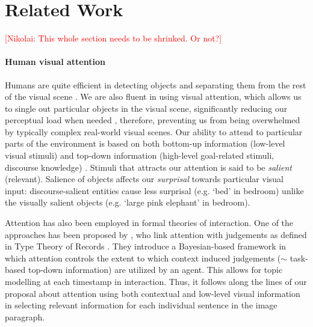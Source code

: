 \documentclass[11pt,a4paper]{article}
\newcommand{\kibitz}[2]{\ifnum\Comments=1\textcolor{#1}{#2}\fi}
\newcommand{\nikolai}[1]{\kibitz{red}      {[Nikolai: #1]}}
\begin{document}

\section{Related Work}

\nikolai{This whole section needs to be shrinked. Or not?}

\paragraph{Human visual attention}
Humans are quite efficient in detecting objects and separating them from the rest of the visual scene \cite{Ullman87}. We are also fluent in using visual attention, which allows us to single out particular objects in the visual scene, significantly reducing our perceptual load when needed \cite{Lavie04}, therefore, preventing us from being overwhelmed by typically complex real-world visual scenes.
Our ability to attend to particular parts of the environment is based on both bottom-up information (low-level visual stimuli) and top-down information (high-level goal-related stimuli, discourse knowledge) \cite{Zarcone2016}. %
Stimuli that attracts our attention is said to be \textit{salient} (relevant). Salience of objects affects our \textit{surprisal} towards particular visual input: discourse-salient entities cause less surprisal (e.g. `bed' in bedroom) unlike the visually salient objects (e.g. `large pink elephant' in bedroom).

Attention has also been employed in formal theories of interaction. One of the approaches has been proposed by , who link attention with judgements as defined in Type Theory of Records \cite{Cooper08typetheory}.
They introduce a Bayesian-based framework in which attention controls the extent to which context induced judgements ($\sim$ task-based top-down information) are utilized by an agent. This allows for topic modelling at each timestamp in interaction.  Thus, it follows along the lines of our proposal about attention using both contextual and low-level visual information in selecting relevant information for each individual sentence in the image paragraph.

\end{document}
